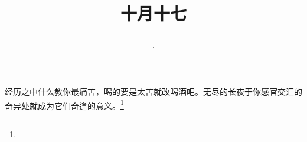 \title{\date[d=17,m=11,y=2024][year:cn-y,年,month:cn,day:cn,日,·,weekday]·十月十七 }
经历之中什么教你最痛苦，喝的要是太苦就改喝酒吧。无尽的长夜于你感官交汇的奇异处就成为它们奇逢的意义。\footnote{ }

